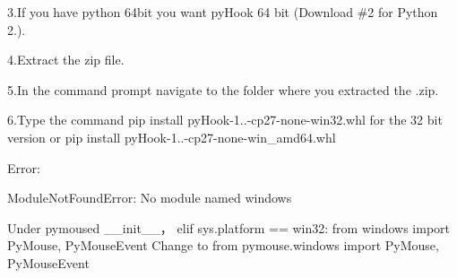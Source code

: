 3.\+If you have python 64bit you want py\+Hook 64 bit (Download \#2 for Python 2.).

4.\+Extract the zip file.

5.\+In the command prompt navigate to the folder where you extracted the .zip.

6.\+Type the command \textquotesingle{}pip install py\+Hook-\/1..-\/cp27-\/none-\/win32.\+whl\textquotesingle{} for the 32 bit version or \textquotesingle{}pip install py\+Hook-\/1..-\/cp27-\/none-\/win\+\_\+amd64.\+whl\textquotesingle{}

Error\+:


\begin{DoxyEnumerate}
\item Module\+Not\+Found\+Error\+: No module named \textquotesingle{}windows\textquotesingle{}
\end{DoxyEnumerate}

Under pymoused \+\_\+\+\_\+init\+\_\+\+\_\+， elif sys.\+platform == \textquotesingle{}win32\textquotesingle{}\+: from windows import Py\+Mouse, Py\+Mouse\+Event Change to \textquotesingle{}from pymouse.\+windows import Py\+Mouse, Py\+Mouse\+Event 